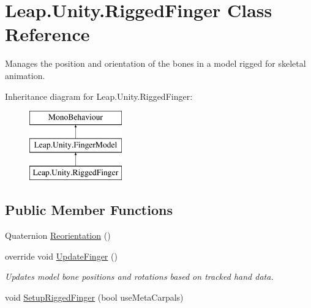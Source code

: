 \hypertarget{class_leap_1_1_unity_1_1_rigged_finger}{}\section{Leap.\+Unity.\+Rigged\+Finger Class Reference}
\label{class_leap_1_1_unity_1_1_rigged_finger}


Manages the position and orientation of the bones in a model rigged for skeletal animation.  


Inheritance diagram for Leap.\+Unity.\+Rigged\+Finger\+:\begin{figure}[H]
\begin{center}
\leavevmode
\includegraphics[height=3.000000cm]{class_leap_1_1_unity_1_1_rigged_finger}
\end{center}
\end{figure}
\subsection*{Public Member Functions}
\begin{DoxyCompactItemize}
\item 
Quaternion \mbox{\hyperlink{class_leap_1_1_unity_1_1_rigged_finger_a559b350e305e18fc0c8cdcbc652a4ec7}{Reorientation}} ()
\item 
override void \mbox{\hyperlink{class_leap_1_1_unity_1_1_rigged_finger_affc59ee8e673ae2c2cf8c4222749f602}{Update\+Finger}} ()
\begin{DoxyCompactList}\small\item\em Updates model bone positions and rotations based on tracked hand data. \end{DoxyCompactList}\item 
void \mbox{\hyperlink{class_leap_1_1_unity_1_1_rigged_finger_aaea2955085d8c4ec4d97a709ee8732e7}{Setup\+Rigged\+Finger}} (bool use\+Meta\+Carpals)
\end{DoxyCompactItemize}

